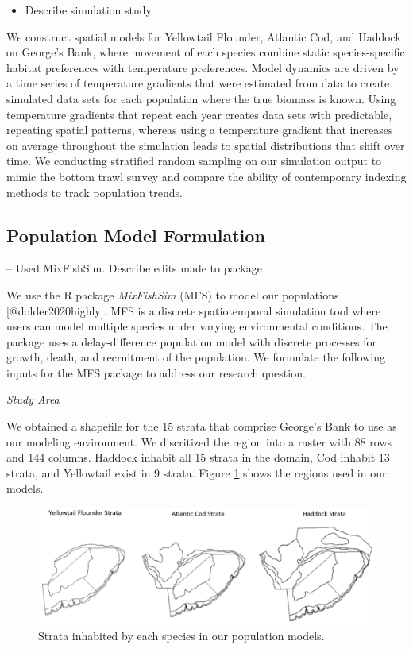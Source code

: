 \documentclass[
]{article}
\providecommand{\tightlist}{%
  \setlength{\itemsep}{0pt}\setlength{\parskip}{0pt}}
\begin{document}
\begin{itemize}
\tightlist
\item
  Describe simulation study
\end{itemize}

We construct spatial models for Yellowtail Flounder, Atlantic Cod, and Haddock on George's Bank, where movement of each species combine static species-specific habitat preferences with temperature preferences. Model dynamics are driven by a time series of temperature gradients that were estimated from data to create simulated data sets for each population where the true biomass is known. Using temperature gradients that repeat each year creates data sets with predictable, repeating spatial patterns, whereas using a temperature gradient that increases on average throughout the simulation leads to spatial distributions that shift over time. We conducting stratified random sampling on our simulation output to mimic the bottom trawl survey and compare the ability of contemporary indexing methods to track population trends.

\subsection{Population Model Formulation}

-- Used MixFishSim. Describe edits made to package

We use the R package \emph{MixFishSim} (MFS) to model our populations {[}@dolder2020highly{]}. MFS is a discrete spatiotemporal simulation tool where users can model multiple species under varying environmental conditions. The package uses a delay-difference population model with discrete processes for growth, death, and recruitment of the population. We formulate the following inputs for the MFS package to address our research question.

\emph{Study Area}

We obtained a shapefile for the 15 strata that comprise George's Bank to use as our modeling environment. We discritized the region into a raster with 88 rows and 144 columns. Haddock inhabit all 15 strata in the domain, Cod inhabit 13 strata, and Yellowtail exist in 9 strata. Figure \ref{fig:strata-plot} shows the regions used in our models.

\begin{figure}

{\centering \includegraphics[width=0.95\linewidth]{Images/Strata} 

}

\caption{Strata inhabited by each species in our population models.}\label{fig:strata-plot}
\end{figure}
\end{document}
